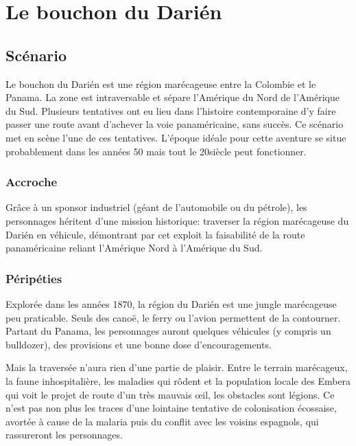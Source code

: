 \chapter{Le bouchon du Darién}

\section{Scénario}

Le bouchon du Darién est une région marécageuse entre la Colombie et le Panama.
La zone est intraversable et sépare l'Amérique du Nord de l'Amérique du Sud.
Plusieurs tentatives ont eu lieu dans l'histoire contemporaine d'y faire passer une route avant d'achever la voie panaméricaine, sans succès.
Ce scénario met en scène l'une de ces tentatives.
L'époque idéale pour cette aventure se situe probablement dans les années 50 mais tout le 20\ieme siècle peut fonctionner.

\subsection{Accroche}

Grâce à un sponsor industriel (géant de l'automobile ou du pétrole), les personnages héritent d'une mission historique: traverser la région marécageuse du Darién en véhicule, démontrant par cet exploit la faisabilité de la route panaméricaine reliant l'Amérique Nord à l'Amérique du Sud.

\subsection{Péripéties}

Explorée dans les années 1870, la région du Darién est une jungle marécageuse peu praticable.
Seuls des canoë, le ferry ou l'avion permettent de la contourner.
Partant du Panama, les personnages auront quelques véhicules (y compris un bulldozer), des provisions et une bonne dose d'encouragements.

Mais la traversée n'aura rien d'une partie de plaisir.
Entre le terrain marécageux, la faune inhospitalière, les maladies qui rôdent et la population locale des Embera qui voit le projet de route d'un très mauvais œil, les obstacles sont légions.
Ce n'est pas non plus les traces d'une lointaine tentative de colonisation écossaise, avortée à cause de la malaria puis du conflit avec les voisins espagnols, qui rassureront les personnages.

